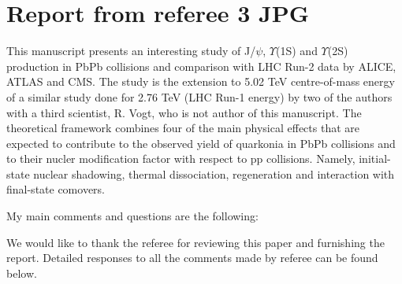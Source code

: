 \documentclass[a4paper,11pt]{article}
\begin{document}
\selectfont


\section*{Report from referee 3 JPG}


This manuscript presents an interesting study of J/$\psi$, $\Upsilon$(1S) and $\Upsilon$(2S)
production in PbPb collisions and comparison with LHC Run-2 data by ALICE, ATLAS and CMS. 
The study is the extension to 5.02 TeV centre-of-mass energy of a similar study done for 2.76
TeV (LHC Run-1 energy) by two of the authors with a third scientist, R. Vogt, who is not author
of this manuscript. The theoretical framework combines four of the main physical effects that
are expected to contribute to the observed yield of quarkonia in PbPb collisions and to their
nucler modification factor with respect to pp collisions. Namely, initial-state nuclear shadowing,
thermal dissociation, regeneration and interaction with final-state comovers. 

My main comments and questions are the following:\newline




{\color{blue}
We would like to thank the referee for reviewing this paper and furnishing the report.
Detailed responses to all the comments made by referee can be found below.}
\end{document}
